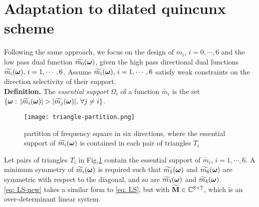 \section{Adaptation to dilated quincunx scheme}
Following the same approach, we focus on the design of $m_i,\,i=0,\cdots,6$ and the low pass dual function $\widetilde{m_{0}}(\boldsymbol{\omega})$, given the high pass directional dual functions $\widetilde{m_{i}}(\boldsymbol{\omega}),\,i=1,\cdots,6$. Assume $\widetilde{m_{i}}(\boldsymbol{\omega}),\,i=1,\cdots,6$ satisfy weak constraints on the direction selectivity of their support.\\
{\bf Definition.}
The {\it essential support} $\Omega_i$ of a function $\widetilde{m_i}$ is the set $\{\V{\omega}:\,|\widetilde{m_i}(\V{\omega})|> |\widetilde{m_j}(\V{\omega})|,\,\forall j\neq i\}$. 

\begin{figure}
\centering
\texttt{[image: triangle-partition.png]}
\caption{partition of frequency square in six directions, where the essential support of $\widetilde{m_{i}}(\boldsymbol{\omega})$ is contained in each pair of triangles $T_i$}
\label{fig: partition 2}
\end{figure}
Let pairs of triangles $T_i$ in Fig.\ref{fig: partition 2} contain the essential support of $\widetilde{m_i},\,i=1,\cdots,6$.
A minimum symmetry of $\widetilde{m_{i}}(\boldsymbol{\omega})$ is required such that $\widetilde{m_{1}}(\boldsymbol{\omega})$ and $\widetilde{m_{6}}(\boldsymbol{\omega})$ are symmetric with respect to the diagonal, and so are $\widetilde{m_{3}}(\boldsymbol{\omega})$ and $\widetilde{m_{4}}(\boldsymbol{\omega})$.\\
\eqref{eq: LS-new} takes a similar form to \eqref{eq: LS}, but with $\widetilde{\mathbf{M}}\in\mathbb{C}^{8\times 7}$, which is an over-determinant linear system.

